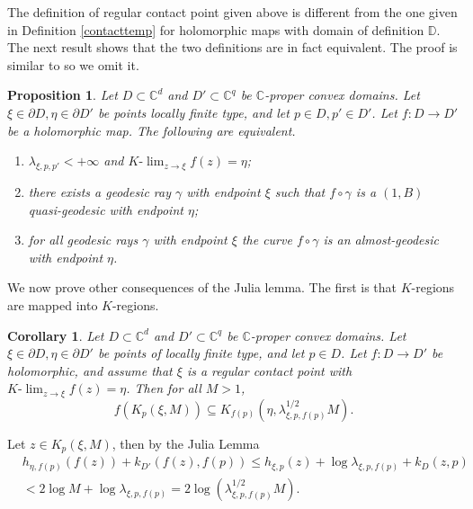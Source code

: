 \documentclass[11pt, reqno]{amsart}
\numberwithin{equation}{section}
\newtheorem{corollary}[theorem]{Corollary}
\newtheorem{proposition}[theorem]{Proposition}
\theoremstyle{definition}
\newcommand{\C}{\mathbb{C}}
\newcommand{\D}{\mathbb{D}}
\begin{document}
{{{		
		
		
		The definition of regular contact point given above is different from the one given in Definition \ref{contacttemp} for holomorphic maps with domain of definition $\D$. The next result shows that the two definitions are in fact equivalent. The proof is similar to \cite[Proposition 3.8, Lemma 3.13]{AFGK}  so we omit it.
		\begin{proposition}\label{eqdefcontact}
			Let $D\subset\C^d$ and $D'\subset\C^{q}$ be  $\C$-proper convex domains. Let $\xi\in\partial D,\eta\in \partial D'$ be points locally finite type, and let $p\in D,p'\in D'$.
			Let $f\colon D\to D'$ be a holomorphic map. The following are equivalent.
			\begin{enumerate}
				\item $\lambda_{\xi,p,p'}<+\infty$ and $K\textrm{-}\lim_{z\to\xi}f(z)=\eta$;
				\item there exists a geodesic ray $\gamma$ with endpoint $\xi$ such that $f\circ \gamma$ is a $(1,B)$ quasi-geodesic with endpoint $\eta$;
				\item for all geodesic rays $\gamma$ with endpoint $\xi$ the curve $f\circ \gamma$ is an almost-geodesic with endpoint $\eta$.
			\end{enumerate}
			
		\end{proposition}
		
		
		
		We now prove other  consequences of the Julia lemma. The first  is that $K$-regions are mapped into $K$-regions.
		\begin{corollary}\label{georintogeor}
			Let $D\subset\C^d$ and $D'\subset\C^{q}$ be  $\C$-proper convex domains.  Let $\xi\in\partial D,\eta\in\partial D'$ be
			points of locally finite type, and let $p\in D$.
			Let $f\colon D\to D'$ be holomorphic, and assume that $\xi$ is a regular contact point with $K\textrm{-}\lim_{z\to\xi}f(z)=\eta$.
			Then for all $M>1$,
			$$f(K_{p}(\xi,M))\subseteq K_{f(p)}(\eta,\lambda_{\xi,p,f(p)}^{1/2}M).$$
		\end{corollary}
		\proof
		Let $z\in K_p(\xi,M)$, then by the Julia Lemma
		\begin{align*}&h_{\eta,f(p)}(f(z))+k_{D'}(f(z),f(p))\leq h_{\xi,p}(z)+\log\lambda_{\xi,p,f(p)}+k_D(z,p)\\ &< 2\log M+\log\lambda_{\xi,p,f(p)}=2\log (\lambda_{\xi,p,f(p)}^{1/2}M).
		\end{align*}
		\endproof
		
		
		
}}}
\end{document}
